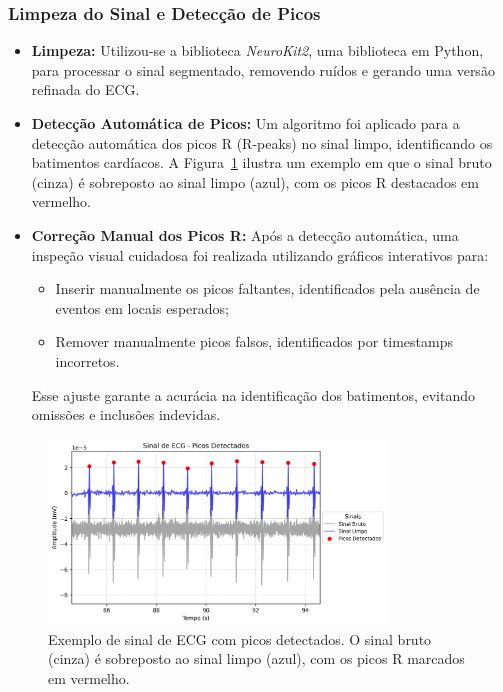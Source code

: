 \subsubsection{Limpeza do Sinal e Detecção de Picos}
\begin{itemize}
    \item \textbf{Limpeza:} Utilizou-se a biblioteca \textit{NeuroKit2}, uma biblioteca em Python, para processar o sinal segmentado, removendo ruídos e gerando uma versão refinada do ECG.
    \item \textbf{Detecção Automática de Picos:} Um algoritmo foi aplicado para a detecção automática dos picos R (R-peaks) no sinal limpo, identificando os batimentos cardíacos. A Figura~\ref{fig:ecg_picos_detectados} ilustra um exemplo em que o sinal bruto (cinza) é sobreposto ao sinal limpo (azul), com os picos R destacados em vermelho.
    \item \textbf{Correção Manual dos Picos R:} Após a detecção automática, uma inspeção visual cuidadosa foi realizada utilizando gráficos interativos para:
    \begin{itemize}
        \item Inserir manualmente os picos faltantes, identificados pela ausência de eventos em locais esperados;
        \item Remover manualmente picos falsos, identificados por timestamps incorretos.
    \end{itemize}
    Esse ajuste garante a acurácia na identificação dos batimentos, evitando omissões e inclusões indevidas.
\end{itemize}

\begin{figure}[htb]
    \centering
    \includegraphics[width=0.8\textwidth]{figs/2_preprocessamento_ecg/1_Sinal_de_ECG_-_Picos_Detectados_zoom.png}
    \caption{Exemplo de sinal de ECG com picos detectados. O sinal bruto (cinza) é sobreposto ao sinal limpo (azul), com os picos R marcados em vermelho.}
    \label{fig:ecg_picos_detectados}
\end{figure}

